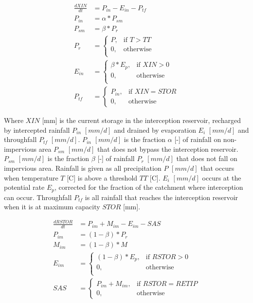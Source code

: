 \begin{align}
	\frac{dXIN}{dt} &= P_{in} - E_{in} - P_{tf}\\
	P_{in} &= \alpha*P_{sm} \\
	P_{sm} &= \beta*P_r\\
	P_r &= \begin{cases}
		P, &\text{if } T > TT \\
		0, & \text{otherwise} \\
	\end{cases} \\
	E_{in} &= \begin{cases}
		\beta*E_p, & \text{if } XIN > 0 \\
		0, & \text{otherwise} \\
	\end{cases} \\
	P_{tf} &= \begin{cases}
		P_{in}, & \text{if } XIN = STOR \\
		0, & \text{otherwise}
	\end{cases}
\end{align}


Where $XIN$ [mm] is the current storage in the interception reservoir, recharged by intercepted rainfall $P_{in}$ $[mm/d]$ and drained by evaporation $E_i$ $[mm/d]$ and throughfall $P_{tf}$ $[mm/d]$. 
$P_{in}$ $[mm/d]$ is the fraction $\alpha$ [-] of rainfall on non-impervious area $P_{sm}$ $[mm/d]$ that does not bypass the interception reservoir. 
$P_{sm}$ $[mm/d]$ is the fraction $\beta$ [-] of rainfall $P_r$ $[mm/d]$ that does not fall on impervious area. 
Rainfall is given as all precipitation $P$ $[mm/d]$ that occurs when temperature $T$ [\degree C] is above a threshold $TT$ [\degree C]. 
$E_i$ $[mm/d]$ occurs at the potential rate $E_p$, corrected for the fraction of the catchment where interception can occur.
Throughfall $P_{tf}$ is all rainfall that reaches the interception reservoir when it is at maximum capacity $STOR$ [mm].

\begin{align}
	\frac{dRSTOR}{dt} &= P_{im} + M_{im} - E_{im} - SAS \\
	P_{im} &= (1-\beta)*P_r \\
	M_{im} &= (1-\beta)*M \\
	E_{im} &= \begin{cases}
		(1-\beta)*E_p, &\text{if } RSTOR > 0 \\
		0, &\text{otherwise} \\
	\end{cases} \\
	SAS &= \begin{cases}
		P_{im} +M_{im}, &\text{if } RSTOR = RETIP \\
		0, &\text{otherwise}
	\end{cases}
\end{align}

